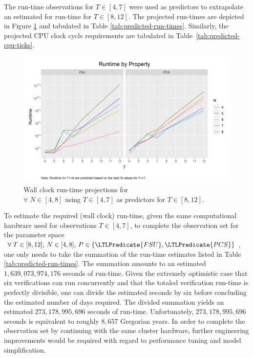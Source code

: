 The run-time observations for \(T \in [4, 7]\) were used as predictors to extrapolate an estimated for run-time for \(T \in [8, 12]\).
The projected run-times are depicted in Figure \ref{fig:runtime-projections} and tabulated in Table \ref{tab:predicted-run-times}.
Similarly, the projected CPU clock cycle requirements are tabulated in Table\ \ref{tab:predicted-cpu-ticks}.

\begin{figure}[ht!]
\centering
\caption[Run-time projections for ]{%
\label{fig:runtime-projections}%
Wall clock run-time projections for \\%
$\forall\; N \in [4, 8]$ using $T \in [4, 7]$ as predictors for $T \in [8, 12]$.
}%
\includegraphics[width=\textwidth]{./figures/fsu-pcs-runtime-combined-preidcted.png}
\end{figure}

To estimate the required (wall clock) run-time, given the same computational hardware used for observations \(T \in [4, 7]\), to complete the observation set for the  parameter space \(\forall\; T \in [8, 12],\, N \in [4, 8],\, P \in \{ \LTLPredicate{FSU}, \LTLPredicate{PCS} \}\), one only needs to take the summation of the run-time estimates listed in Table \ref{tab:predicted-run-times}.
The summation amounts to an estimated \(1,639,073,974,176\) seconds of run-time.
Given the extremely optimistic case that six verifications can run concurrently and that the totaled verification run-time is perfectly divisible, one can divide the estimated seconds by six before concluding the estimated number of days required.
The divided summation yields an estimated \(273,178,995,696\) seconds of run-time.
Unfortunately, \(273,178,995,696\) seconds is equivalent to roughly \(8,657\) Gregorian years.
In order to complete the observation set by continuing with the same cluster hardware, further engineering improvements would be required with regard to performance tuning and model simplification.


